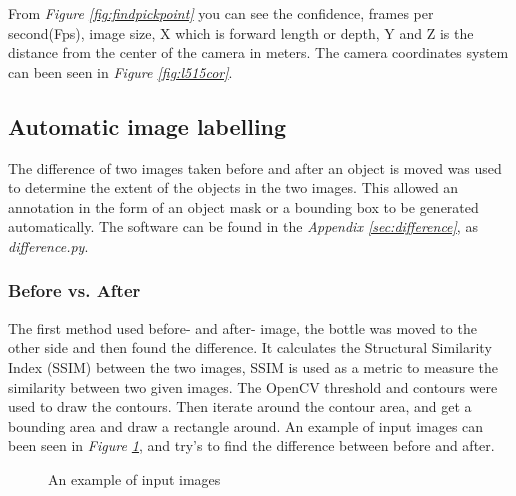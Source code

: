From \textit{Figure \ref{fig:findpickpoint}} you can see the confidence, frames per second(Fps), image size, X which is forward length or depth, Y and Z is the distance from the center of the camera in meters. 
The camera coordinates system can been seen in \textit{Figure \ref{fig:l515cor}}.


\subsection{Automatic image labelling}\label{labelimg}

The difference of two images taken before and after an object is moved was used to determine the extent of the objects in the two images. This allowed an annotation in the form of an object mask or a bounding box to be generated automatically. The software can be found in the \textit{Appendix \ref{sec:difference}}, as \textit{difference.py}.

\subsubsection*{Before vs. After}\label{beforeandafter}
The first method used before- and after- image, the bottle was moved to the other side and then found the difference. It calculates the Structural Similarity Index (SSIM) between the two images, SSIM\cite{datta_all_2020} is used as a metric to measure the similarity between two given images. The OpenCV threshold and contours were used to draw the contours. Then iterate around the contour area, and get a bounding area and draw a rectangle around.
An example of input images can been seen in \textit{Figure \ref{figure: beforeafter}}, and try's to find the difference between before and after.
\begin{figure}[h]
 \centering
 \hfill
 \caption{An example of input images}
 \label{figure: beforeafter}
\end{figure}

